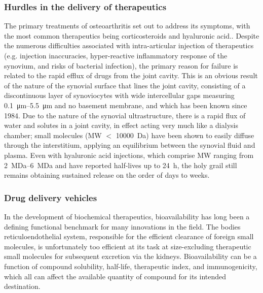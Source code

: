 \begin{refsection}
\subsubsection{Hurdles in the delivery of therapeutics}

The primary treatments of osteoarthritis set out to address its symptoms, with
the most common therapeutics being corticosteroids and hyaluronic
acid.\cite{Butoescu2009}. Despite the numerous difficulties associated with
intra-articular injection of therapeutics (e.g. injection inaccuracies,
hyper-reactive inflammatory response of the synovium, and risks of bacterial
infection), the primary reason for failure is related to the rapid efflux of
drugs from the joint cavity.\cite{Ayral2001} This is an obvious result of the
nature of the synovial surface that lines the joint cavity, consisting of a
discontinuous layer of synoviocytes with wide intercellular gaps measuring
\SIrange{0.1}{5.5}{\um} and no basement membrane, and which has been known since
1984.\cite{Knight1984} Due to the nature of the synovial ultrastructure, there
is a rapid flux of water and solutes in a joint cavity, in effect acting very
much like a dialysis chamber; small molecules (MW ${<}$ \SI{10000}{\dalton}) have
been shown to easily diffuse through the interstitium, applying an equilibrium
between the synovial fluid and plasma.\cite{Gerwin2006,Okuyama1984} Even with
hyaluronic acid injections, which comprise MW ranging from
\SIrange{2}{6}{\mega\dalton} and have reported half-lives up to \SI{24}{\hour},
the holy grail still remains obtaining sustained release on the order of days to
weeks.

\subsubsection{Drug delivery vehicles}

In the development of biochemical therapeutics, bioavailability has long been a
defining functional benchmark for many innovations in the field. The bodies
reticuloendothelial system, responsible for the efficient clearance of foreign
small molecules, is unfortunately too efficient at its task at size-excluding
therapeutic small molecules for subsequent excretion via the kidneys.
Bioavailability can be a function of compound solubility, 
half-life, therapeutic index, and immunogenicity, which all can affect the
available quantity of compound for its intended
destination.\cite{Petros2010,Davis2008,Shah1992}


\end{refsection}
